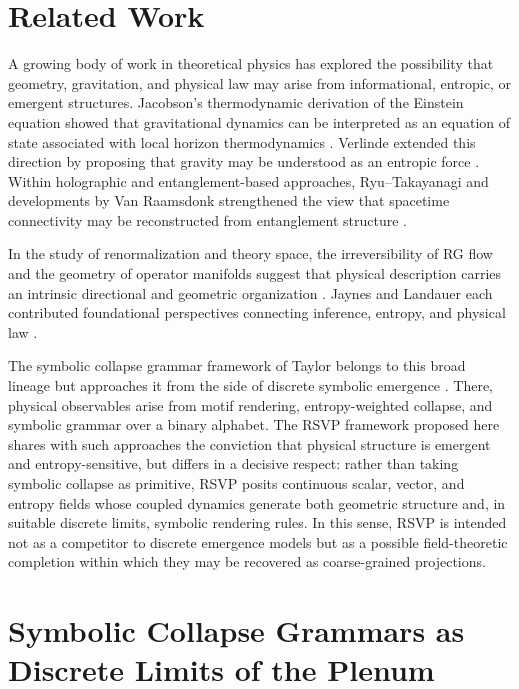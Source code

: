 \documentclass[12pt,a4paper]{article}
\theoremstyle{plain}
\theoremstyle{definition}
\theoremstyle{remark}
\begin{document}
\section{Related Work}
\label{sec:relatedwork}

A growing body of work in theoretical physics has explored the
possibility that geometry, gravitation, and physical law may arise from
informational, entropic, or emergent structures. Jacobson's thermodynamic
derivation of the Einstein equation showed that gravitational dynamics
can be interpreted as an equation of state associated with local horizon
thermodynamics \cite{Jacobson1995}. Verlinde extended this direction by
proposing that gravity may be understood as an entropic force
\cite{Verlinde2011}. Within holographic and entanglement-based
approaches, Ryu--Takayanagi and developments by Van Raamsdonk
strengthened the view that spacetime connectivity may be reconstructed
from entanglement structure \cite{RyuTakayanagi2006,VanRaamsdonk2010}.

In the study of renormalization and theory space, the irreversibility of
RG flow and the geometry of operator manifolds suggest that physical
description carries an intrinsic directional and geometric organization
\cite{Zamolodchikov1986,PannellStergiou2025}. Jaynes and Landauer each
contributed foundational perspectives connecting inference, entropy, and
physical law \cite{Jaynes1957,Landauer1961}.

The symbolic collapse grammar framework of Taylor belongs to this broad
lineage but approaches it from the side of discrete symbolic emergence
\cite{Taylor2025}. There, physical observables arise from motif
rendering, entropy-weighted collapse, and symbolic grammar over a binary
alphabet. The RSVP framework proposed here shares with such approaches
the conviction that physical structure is emergent and entropy-sensitive,
but differs in a decisive respect: rather than taking symbolic collapse
as primitive, RSVP posits continuous scalar, vector, and entropy fields
whose coupled dynamics generate both geometric structure and, in suitable
discrete limits, symbolic rendering rules. In this sense, RSVP is
intended not as a competitor to discrete emergence models but as a
possible field-theoretic completion within which they may be recovered as
coarse-grained projections.

\section{Symbolic Collapse Grammars as Discrete Limits of the Plenum}
\label{sec:symboliccollapse}
\end{document}
